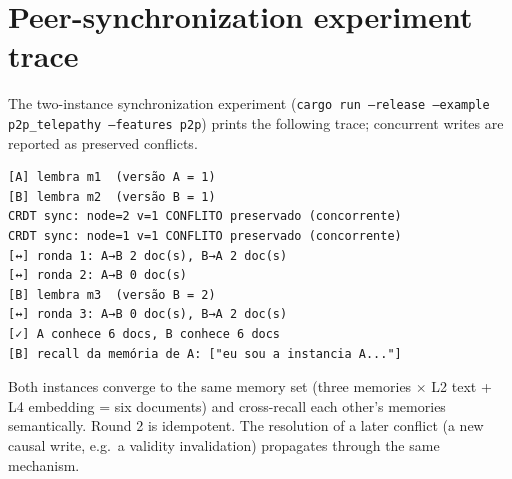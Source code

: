 \documentclass[11pt,twocolumn]{article}
\begin{document}
\appendix
\section{Peer-synchronization experiment trace}
\label{app:trace}

The two-instance synchronization experiment
(\texttt{cargo run --release --example p2p\_telepathy --features p2p}) prints
the following trace; concurrent writes are reported as preserved conflicts.

{\scriptsize
\begin{verbatim}
[A] lembra m1  (versão A = 1)
[B] lembra m2  (versão B = 1)
CRDT sync: node=2 v=1 CONFLITO preservado (concorrente)
CRDT sync: node=1 v=1 CONFLITO preservado (concorrente)
[↔] ronda 1: A→B 2 doc(s), B→A 2 doc(s)
[↔] ronda 2: A→B 0 doc(s)
[B] lembra m3  (versão B = 2)
[↔] ronda 3: A→B 0 doc(s), B→A 2 doc(s)
[✓] A conhece 6 docs, B conhece 6 docs
[B] recall da memória de A: ["eu sou a instancia A..."]
\end{verbatim}
}

Both instances converge to the same memory set (three memories $\times$ L2
text + L4 embedding = six documents) and cross-recall each other's memories
semantically. Round 2 is idempotent. The resolution of a later conflict (a new
causal write, e.g.\ a validity invalidation) propagates through the same
mechanism.
\end{document}
